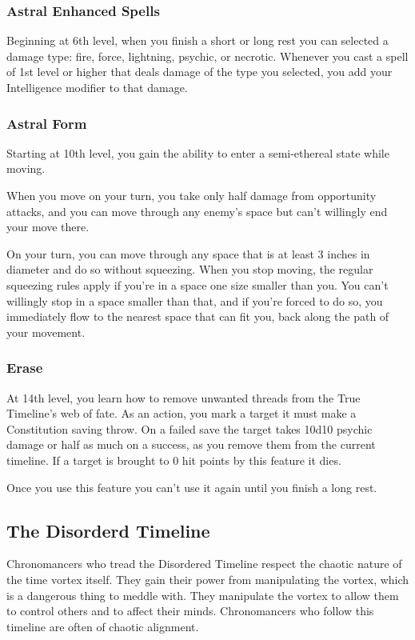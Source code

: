 \subsubsection{Astral Enhanced Spells}

Beginning at 6th level, when you finish a short or long rest you can selected a damage type: fire, force, lightning, psychic, or necrotic. Whenever you cast a spell of 1st level or higher that deals damage of the type you selected, you add your Intelligence modifier to that damage.

\subsubsection{Astral Form}

Starting at 10th level, you gain the ability to enter a semi-ethereal state while moving.

When you move on your turn, you take only half damage from opportunity attacks, and you can move through any enemy's space but can't willingly end your move there.

On your turn, you can move through any space that is at least 3 inches in diameter and do so without squeezing. When you stop moving, the regular squeezing rules apply if you're in a space one size smaller than you. You can't willingly stop in a space smaller than that, and if you're forced to do so, you immediately flow to the nearest space that can fit you, back along the path of your movement.

\subsubsection{Erase}

At 14th level, you learn how to remove unwanted threads from the True Timeline's web of fate. As an action, you mark a target it must make a Constitution saving throw. On a failed save the target takes 10d10 psychic damage or half as much on a success, as you remove them from the current timeline. If a target is brought to 0 hit points by this feature it dies.

Once you use this feature you can't use it again until you finish a long rest.

\subsection{The Disorderd Timeline}

Chronomancers who tread the Disordered Timeline respect the chaotic nature of the time vortex itself. They gain their power from manipulating the vortex, which is a dangerous thing to meddle with. They manipulate the vortex to allow them to control others and to affect their minds. Chronomancers who follow this timeline are often of chaotic alignment.

